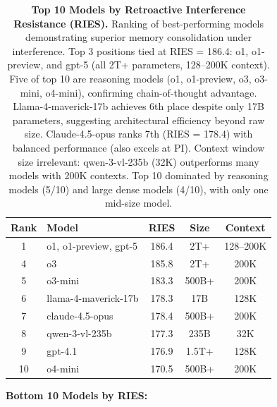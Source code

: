 \documentclass{article}
\begin{document}
\begin{table}[t]
\centering
\caption{\textbf{Top 10 Models by Retroactive Interference Resistance (RIES).}
Ranking of best-performing models demonstrating superior memory consolidation under interference.
Top 3 positions tied at RIES = 186.4: o1, o1-preview, and gpt-5 (all 2T+ parameters, 128--200K context).
Five of top 10 are reasoning models (o1, o1-preview, o3, o3-mini, o4-mini), confirming chain-of-thought advantage.
Llama-4-maverick-17b achieves 6th place despite only 17B parameters, suggesting architectural efficiency beyond raw size.
Claude-4.5-opus ranks 7th (RIES = 178.4) with balanced performance (also excels at PI).
Context window size irrelevant: qwen-3-vl-235b (32K) outperforms many models with 200K contexts.
Top 10 dominated by reasoning models (5/10) and large dense models (4/10), with only one mid-size model.}
\begin{tabular}{clccc}
\toprule
Rank & Model & RIES & Size & Context \\
\midrule
1 & o1, o1-preview, gpt-5 & 186.4 & 2T+ & 128--200K \\
4 & o3 & 185.8 & 2T+ & 200K \\
5 & o3-mini & 183.3 & 500B+ & 200K \\
6 & llama-4-maverick-17b & 178.3 & 17B & 128K \\
7 & claude-4.5-opus & 178.4 & 500B+ & 200K \\
8 & qwen-3-vl-235b & 177.3 & 235B & 32K \\
9 & gpt-4.1 & 176.9 & 1.5T+ & 128K \\
10 & o4-mini & 170.5 & 500B+ & 200K \\
\bottomrule
\end{tabular}
\end{table}

\textbf{Bottom 10 Models by RIES:}
\end{document}
